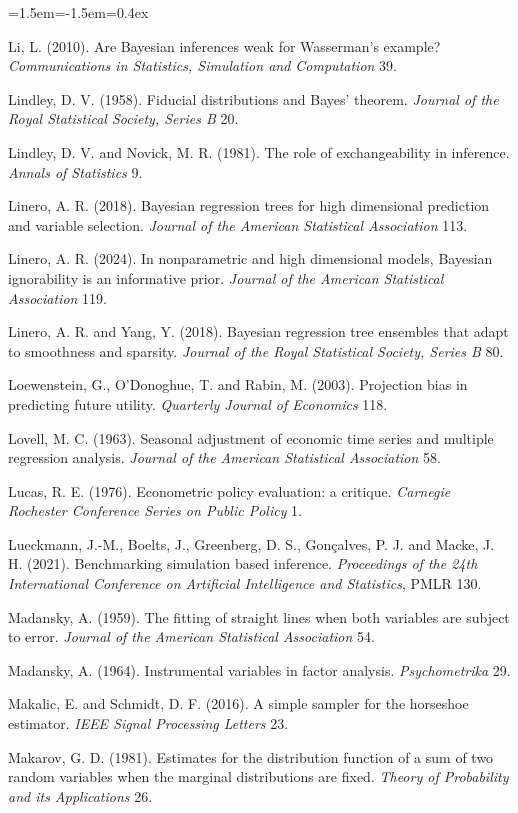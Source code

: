 \begin{list}{}{\leftmargin=1.5em\itemindent=-1.5em\itemsep=0.4ex}
\item Li, L. (2010). Are Bayesian inferences weak for Wasserman's example? \emph{Communications in Statistics, Simulation and Computation} 39.
\item Lindley, D. V. (1958). Fiducial distributions and Bayes' theorem. \emph{Journal of the Royal Statistical Society, Series B} 20.
\item Lindley, D. V. and Novick, M. R. (1981). The role of exchangeability in inference. \emph{Annals of Statistics} 9.
\item Linero, A. R. (2018). Bayesian regression trees for high dimensional prediction and variable selection. \emph{Journal of the American Statistical Association} 113.
\item Linero, A. R. (2024). In nonparametric and high dimensional models, Bayesian ignorability is an informative prior. \emph{Journal of the American Statistical Association} 119.
\item Linero, A. R. and Yang, Y. (2018). Bayesian regression tree ensembles that adapt to smoothness and sparsity. \emph{Journal of the Royal Statistical Society, Series B} 80.
\item Loewenstein, G., O'Donoghue, T. and Rabin, M. (2003). Projection bias in predicting future utility. \emph{Quarterly Journal of Economics} 118.
\item Lovell, M. C. (1963). Seasonal adjustment of economic time series and multiple regression analysis. \emph{Journal of the American Statistical Association} 58.
\item Lucas, R. E. (1976). Econometric policy evaluation: a critique. \emph{Carnegie Rochester Conference Series on Public Policy} 1.
\item Lueckmann, J.-M., Boelts, J., Greenberg, D. S., Gon\c{c}alves, P. J. and Macke, J. H. (2021). Benchmarking simulation based inference. \emph{Proceedings of the 24th International Conference on Artificial Intelligence and Statistics}, PMLR 130.
\item Madansky, A. (1959). The fitting of straight lines when both variables are subject to error. \emph{Journal of the American Statistical Association} 54.
\item Madansky, A. (1964). Instrumental variables in factor analysis. \emph{Psychometrika} 29.
\item Makalic, E. and Schmidt, D. F. (2016). A simple sampler for the horseshoe estimator. \emph{IEEE Signal Processing Letters} 23.
\item Makarov, G. D. (1981). Estimates for the distribution function of a sum of two random variables when the marginal distributions are fixed. \emph{Theory of Probability and its Applications} 26.

\end{list}
